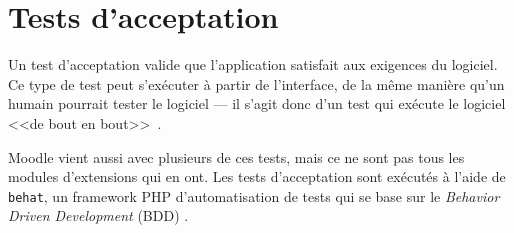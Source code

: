 \section{Tests d'acceptation}
\label{test_acceptation}
Un test d'acceptation valide que l'application satisfait aux exigences du logiciel.
Ce type de test peut s'ex\'ecuter \`a partir de l'interface, de la m\^eme mani\`ere qu'un humain pourrait tester le logiciel --- il s'agit donc d'un test qui ex\'ecute le logiciel <<de bout en bout>>~\cite{tremblay16}.

Moodle vient aussi avec plusieurs de ces tests, mais ce ne sont pas tous les modules d'extensions qui en ont.
%
Les tests d'acceptation sont ex\'ecut\'es \`a l'aide de \texttt{behat}, un \og framework \fg{} PHP d'automatisation de tests qui se base sur le \og \textit{Behavior Driven Development} (BDD) \fg{}.



